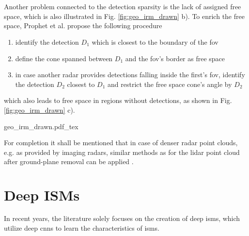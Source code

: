 \\\\
Another problem connected to the detection sparsity is the lack of assigned free space, which is also illustrated in Fig. \ref{fig:geo_irm_drawn} b). To enrich the free space, Prophet et al. \cite{prophet2018adaptions} propose the following procedure
\begin{enumerate}
	\item identify the detection $D_1$ which is closest to the boundary of the \gls{fov}
	\item define the cone spanned between $D_1$ and the \gls{fov}'s border as free space
	\item in case another radar provides detections falling inside the first's \gls{fov}, identify the detection $D_2$ closest to $D_1$ and restrict the free space cone's angle by $D_2$   
\end{enumerate}
which also leads to free space in regions without detections, as shown in Fig. \ref{fig:geo_irm_drawn} c).
\begin{center}
	{geo_irm_drawn.pdf_tex}
\end{center}
For completion it shall be mentioned that in case of denser radar point clouds, e.g. as provided by imaging radars, similar methods as for the lidar point cloud after ground-plane removal can be applied \cite{slutsky2019dual}.
%
\section{Deep ISMs}
\label{sec:deep_isms}
In recent years, the literature solely focuses on the creation of deep \gls{ism}s, which utilize deep \gls{cnn}s to learn the characteristics of \gls{ism}s. 
%
